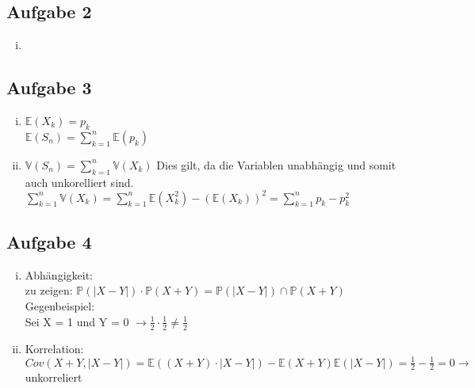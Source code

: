 \documentclass[10pt,a4paper,parskip=half]{scrartcl}
\begin{document}
\subsection*{Aufgabe 2}
\begin{enumerate}[(i)]
\item
\end{enumerate}

\subsection*{Aufgabe 3}
\begin{enumerate}[(i)]
\item
$\mathbb{E}(X_k) = p_k$ \\
$\mathbb{E}(S_n) = \sum\limits_{k=1}^n \mathbb{E}(p_k) $

\item
$\mathbb{V}(S_n) = \sum\limits_{k=1}^n \mathbb V(X_k)$
Dies gilt, da die Variablen unabhängig und somit auch unkorelliert sind. 
$\sum\limits_{k=1}^n \mathbb V(X_k) = \sum\limits_{k=1}^n \mathbb E (X_k^2) - (\mathbb E (X_k))^2 = \sum\limits_{k=1}^n p_k - p_k^2$
\end{enumerate}

\subsection*{Aufgabe 4}
\begin{enumerate}[(i)]
\item
Abhängigkeit: \\
zu zeigen:
$\mathbb{P}(|X-Y|) \cdot \mathbb{P}(X+Y) = \mathbb{P}(|X-Y|) \cap \mathbb{P}(X+Y)$ \\
Gegenbeispiel: \\
Sei X = 1 und Y = 0
$\rightarrow \frac{1}{2} \cdot \frac{1}{2} \neq \frac{1}{2}$
\item
Korrelation: \\
$Cov(X+Y, |X-Y|) = \mathbb{E}((X+Y) \cdot |X-Y|) - \mathbb{E}(X+Y)\mathbb{E}(|X-Y|) = \frac{1}{2} - \frac{1}{2} = 0 \rightarrow$ unkorreliert \\
\end{enumerate}
\end{document}
